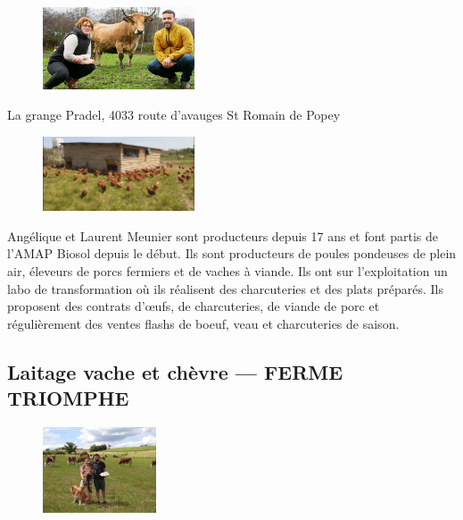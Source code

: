 \documentclass[8pt,a4paper,french]{article}
\makeatletter
\newcommand{\authoredby}[1]{\addtocontents{toc}{\protect\@nameuse{authoredby#1}}}%
\makeatother
\begin{document}
\begin{figure}
\includegraphics[width=0.4\textwidth]{MEUNIER1.jpg}
\end{figure}

\newline
La grange Pradel, 4033 route d'avauges St Romain de Popey \newline

\vspace{9em}

\begin{figure}
\includegraphics[width=0.4\textwidth]{MEUNIER2.jpg}
\end{figure}

\noindent Angélique et Laurent Meunier sont producteurs depuis 17 ans
et font partis de l'AMAP Biosol depuis le début. Ils sont producteurs
de poules pondeuses de plein air, éleveurs de porcs fermiers et de
vaches à viande. Ils ont sur l'exploitation un labo de transformation
où ils réalisent des charcuteries et des plats préparés. Ils proposent
des contrats d'{\oe}ufs, de charcuteries, de viande de porc et
régulièrement des ventes flashs de boeuf, veau et charcuteries de
saison.

\authoredby{B}
\subsection{Laitage vache et chèvre --- FERME TRIOMPHE}\label{subsec:laitage}

\begin{figure}
\includegraphics[width=0.3\textwidth]{TRIOMPHE1.jpg}
\end{figure}
\end{document}
